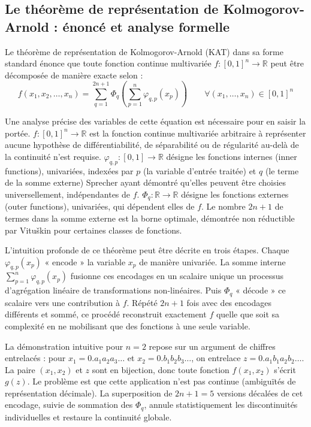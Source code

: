 \documentclass[11pt,a4paper,oneside]{report}
\theoremstyle{definition}
\theoremstyle{remark}
\begin{document}
\subsection{Le théorème de représentation de Kolmogorov-Arnold : énoncé et analyse formelle}

Le théorème de représentation de Kolmogorov-Arnold (KAT) dans sa forme standard énonce que toute fonction continue multivariée $f : [0,1]^n \rightarrow \mathbb{R}$ peut être décomposée de manière exacte selon :
\begin{equation}
f(x_1, x_2, \ldots, x_n) = \sum_{q=1}^{2n+1} \Phi_q\left(\sum_{p=1}^{n} \varphi_{q,p}(x_p)\right) \qquad \forall (x_1, \ldots, x_n) \in [0,1]^n
\end{equation}

Une analyse précise des variables de cette équation est nécessaire pour en saisir la portée. $f : [0,1]^n \rightarrow \mathbb{R}$ est la fonction continue multivariée arbitraire à représenter  aucune hypothèse de différentiabilité, de séparabilité ou de régularité au-delà de la continuité n'est requise. $\varphi_{q,p} : [0,1] \rightarrow \mathbb{R}$ désigne les fonctions internes (inner functions), univariées, indexées par $p$ (la variable d'entrée traitée) et $q$ (le terme de la somme externe)  Sprecher ayant démontré qu'elles peuvent être choisies universellement, indépendantes de $f$. $\Phi_q : \mathbb{R} \rightarrow \mathbb{R}$ désigne les fonctions externes (outer functions), univariées, qui dépendent elles de $f$. Le nombre $2n+1$ de termes dans la somme externe est la borne optimale, démontrée non réductible par Vituškin pour certaines classes de fonctions.

L'intuition profonde de ce théorème peut être décrite en trois étapes. Chaque $\varphi_{q,p}(x_p)$ « encode » la variable $x_p$ de manière univariée. La somme interne $\sum_{p=1}^{n} \varphi_{q,p}(x_p)$ fusionne ces encodages en un scalaire unique  un processus d'agrégation linéaire de transformations non-linéaires. Puis $\Phi_q$ « décode » ce scalaire vers une contribution à $f$. Répété $2n+1$ fois avec des encodages différents et sommé, ce procédé reconstruit exactement $f$  quelle que soit sa complexité  en ne mobilisant que des fonctions à une seule variable.

La démonstration intuitive pour $n=2$ repose sur un argument de chiffres entrelacés : pour $x_1 = 0.a_1a_2a_3\ldots$ et $x_2 = 0.b_1b_2b_3\ldots$, on entrelace $z = 0.a_1b_1a_2b_2\ldots$. La paire $(x_1, x_2)$ et $z$ sont en bijection, donc toute fonction $f(x_1, x_2)$ s'écrit $g(z)$. Le problème est que cette application n'est pas continue (ambiguïtés de représentation décimale). La superposition de $2n+1=5$ versions décalées de cet encodage, suivie de sommation des $\Phi_q$, annule statistiquement les discontinuités individuelles et restaure la continuité globale.
\end{document}
